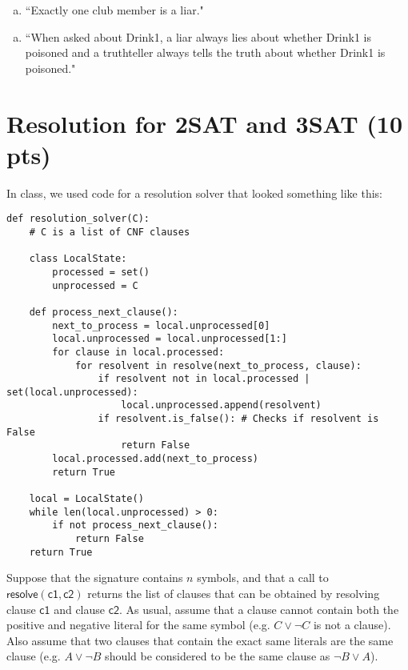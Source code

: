 \documentclass{article}
\begin{document}
\begin{enumerate}[(b)]
\item ``Exactly one club member is a liar."
\end{enumerate}

\begin{enumerate}[(c)]
\item ``When asked about Drink1, a liar always lies about whether Drink1 is poisoned and a truthteller always tells the truth about whether Drink1 is poisoned."
\end{enumerate}



\newpage

\section{Resolution for 2SAT and 3SAT (10 pts)}

In class, we used code for a resolution solver that looked something like this:

\begin{verbatim}
def resolution_solver(C):
    # C is a list of CNF clauses
   
    class LocalState:
        processed = set()
        unprocessed = C
    
    def process_next_clause():
        next_to_process = local.unprocessed[0]
        local.unprocessed = local.unprocessed[1:]
        for clause in local.processed:
            for resolvent in resolve(next_to_process, clause):
                if resolvent not in local.processed | set(local.unprocessed):
                    local.unprocessed.append(resolvent)  
                if resolvent.is_false(): # Checks if resolvent is False
                    return False
        local.processed.add(next_to_process)
        return True
        
    local = LocalState()
    while len(local.unprocessed) > 0:
        if not process_next_clause():
            return False
    return True	
\end{verbatim}

\noindent Suppose that the signature contains $n$ symbols, and that a call to $\mathsf{resolve}(\mathsf{c1}, \mathsf{c2})$ returns the list of clauses that can be obtained by resolving clause $\mathsf{c1}$ and clause $\mathsf{c2}$. As usual, assume that a clause cannot contain both the positive and negative literal for the same symbol (e.g. $C \lor \lnot C$ is not a clause). Also assume that two clauses that contain the exact same literals are the same clause (e.g. $A \lor \lnot B$ should be considered to be the same clause as $\lnot B \lor A$).
\end{document}
